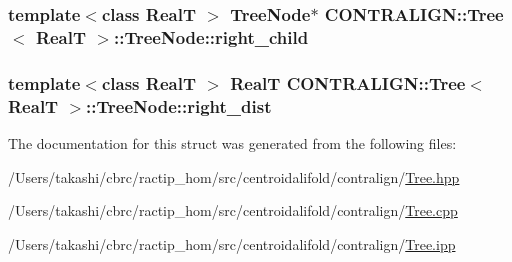\hypertarget{struct_c_o_n_t_r_a_l_i_g_n_1_1_tree_1_1_tree_node_a89df07cf7699c58d8b4ef594322a0e1a}{
\subsubsection[{right\+\_\+child}]{\setlength{\rightskip}{0pt plus 5cm}template$<$class Real\+T $>$ {\bf Tree\+Node}$\ast$ {\bf C\+O\+N\+T\+R\+A\+L\+I\+G\+N\+::\+Tree}$<$ Real\+T $>$\+::Tree\+Node\+::right\+\_\+child}}\label{struct_c_o_n_t_r_a_l_i_g_n_1_1_tree_1_1_tree_node_a89df07cf7699c58d8b4ef594322a0e1a}
\hypertarget{struct_c_o_n_t_r_a_l_i_g_n_1_1_tree_1_1_tree_node_ab216db550a42f2a12765635b113d07b4}{
\subsubsection[{right\+\_\+dist}]{\setlength{\rightskip}{0pt plus 5cm}template$<$class Real\+T $>$ Real\+T {\bf C\+O\+N\+T\+R\+A\+L\+I\+G\+N\+::\+Tree}$<$ Real\+T $>$\+::Tree\+Node\+::right\+\_\+dist}}\label{struct_c_o_n_t_r_a_l_i_g_n_1_1_tree_1_1_tree_node_ab216db550a42f2a12765635b113d07b4}


The documentation for this struct was generated from the following files\+:\begin{DoxyCompactItemize}
\item 
/\+Users/takashi/cbrc/ractip\+\_\+hom/src/centroidalifold/contralign/\hyperlink{_tree_8hpp}{Tree.\+hpp}\item 
/\+Users/takashi/cbrc/ractip\+\_\+hom/src/centroidalifold/contralign/\hyperlink{_tree_8cpp}{Tree.\+cpp}\item 
/\+Users/takashi/cbrc/ractip\+\_\+hom/src/centroidalifold/contralign/\hyperlink{_tree_8ipp}{Tree.\+ipp}\end{DoxyCompactItemize}
